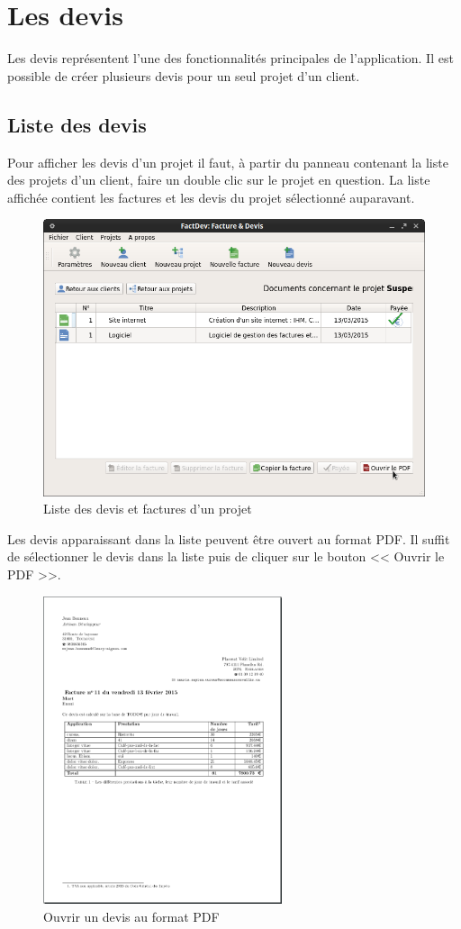 \chapter{Les devis}
Les devis représentent l'une des fonctionnalités principales de l'application. Il est possible de créer plusieurs devis pour un seul projet d'un client. 
\section{Liste des devis}
Pour afficher les devis d'un projet il faut, à partir du panneau contenant la liste des projets d'un client, faire un double clic sur le projet en question. La liste affichée contient les factures et les devis du projet sélectionné auparavant.
\begin{figure}[H]
	\centering
	\includegraphics[width=12cm]{screens/ihmDevis.png}
	\caption{Liste des devis et factures d'un projet}
\end{figure}
Les devis apparaissant dans la liste peuvent être ouvert au format PDF. Il suffit de sélectionner le devis dans la liste puis de cliquer sur le bouton << Ouvrir le PDF >>. 
\begin{figure}[H]
	\centering
	\includegraphics[width=7cm]{screens/genererPDF.png}
	\caption{Ouvrir un devis au format PDF}
	\label{fig:ouvrirPDF}
\end{figure}
